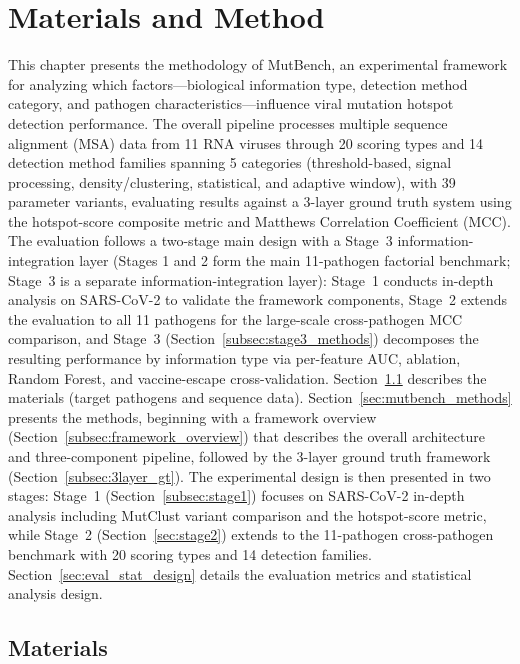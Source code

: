\chapter{Materials and Method}
\label{ch:mutbench}

This chapter presents the methodology of MutBench, an experimental framework for analyzing which factors---biological information type, detection method category, and pathogen characteristics---influence viral mutation hotspot detection performance.
The overall pipeline processes multiple sequence alignment (MSA) data from 11 RNA viruses through 20 scoring types and 14 detection method families spanning 5 categories (threshold-based, signal processing, density/clustering, statistical, and adaptive window), with 39 parameter variants, evaluating results against a 3-layer ground truth system using the hotspot-score composite metric and Matthews Correlation Coefficient (MCC).
The evaluation follows a two-stage main design with a Stage~3 information-integration layer (Stages 1 and 2 form the main 11-pathogen factorial benchmark; Stage~3 is a separate information-integration layer): Stage~1 conducts in-depth analysis on SARS-CoV-2 to validate the framework components, Stage~2 extends the evaluation to all 11 pathogens for the large-scale cross-pathogen MCC comparison, and Stage~3 (Section~\ref{subsec:stage3_methods}) decomposes the resulting performance by information type via per-feature AUC, ablation, Random Forest, and vaccine-escape cross-validation.
Section~\ref{sec:mutbench_materials} describes the materials (target pathogens and sequence data).
Section~\ref{sec:mutbench_methods} presents the methods, beginning with a framework overview (Section~\ref{subsec:framework_overview}) that describes the overall architecture and three-component pipeline, followed by the 3-layer ground truth framework (Section~\ref{subsec:3layer_gt}).
The experimental design is then presented in two stages: Stage~1 (Section~\ref{subsec:stage1}) focuses on SARS-CoV-2 in-depth analysis including MutClust variant comparison and the hotspot-score metric, while Stage~2 (Section~\ref{sec:stage2}) extends to the 11-pathogen cross-pathogen benchmark with 20 scoring types and 14 detection families.
Section~\ref{sec:eval_stat_design} details the evaluation metrics and statistical analysis design.
\label{sec:9pathogen_benchmark}

\section{Materials}
\label{sec:mutbench_materials}

